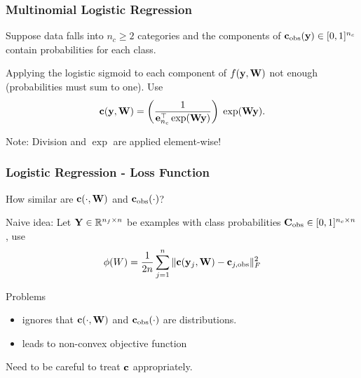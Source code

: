 \documentclass[12pt,fleqn,handout]{beamer}
\begin{document}
\begin{frame}
	\frametitle{Multinomial Logistic Regression}
	
	Suppose data falls into $n_c\geq 2$ categories and the components of ${\bf c}_{\rm obs}({\bf y}) \in[0,1]^{n_c}$ contain probabilities for each class. 
	
	\bigskip
	 
	Applying the logistic sigmoid to each component of $f({\bf y},{\bf W})$ not enough (probabilities must sum to one). Use
	$$
		{\bf c}({\bf y},{\bf W}) = \left( \frac{1}{{\bf e}_{n_c}^\top\exp({\bf W}{\bf y})} \right) \; \exp({\bf W}{\bf y}).
	$$
	
	\bigskip
	
	Note: Division and $\exp$ are applied element-wise!
	
\end{frame}
\begin{frame}
	\frametitle{Logistic Regression - Loss Function}
	
	How similar are ${\bf c}(\cdot,{\bf W})$ and ${\bf c}_{\rm obs}(\cdot)$?
	
\bigskip

	Naive idea: Let ${\bf Y} \in \mathbb{R}^{n_f\times n}$ be examples with class probabilities ${\bf C}_{\rm obs} \in [0,1]^{n_c\times n}$, use 
	$$
	\phi(W)= \frac{1}{2n} \sum_{j=1}^n\|{\bf c}({\bf y}_j,{\bf W}) - {\bf c}_{j,{\rm obs}} \|_F^2
	$$

Problems
\begin{itemize}
	\item ignores that ${\bf c}(\cdot,{\bf W})$ and ${\bf c}_{\rm obs}(\cdot)$ are distributions.
	\item leads to non-convex objective function
\end{itemize} 

\bigskip

Need to be careful to treat ${\bf c}$ appropriately. 	
	
\end{frame}
\end{document}
